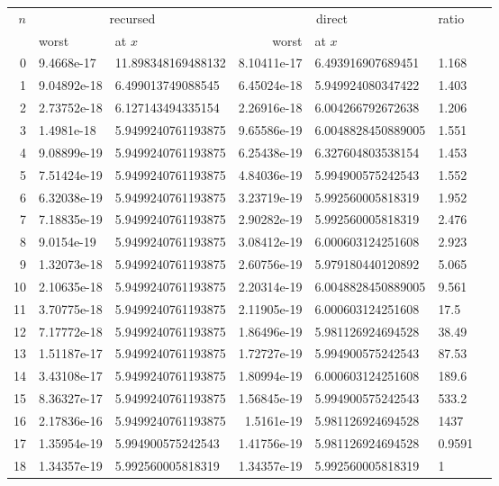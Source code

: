 \begin{tabular}{rllrllr}
\toprule
$n$ & \multicolumn{2}{c}{recursed} & \multicolumn{2}{c}{direct} & ratio\\
\cmidrule(lr){2-3}\cmidrule(lr){4-5}
 & worst & at $x$ & worst & at $x$ &\\
\midrule
 0 & 9.4668e-17 & 11.898348169488132 & 8.10411e-17 & 6.493916907689451 & 1.168\\
 1 & 9.04892e-18 & 6.499013749088545 & 6.45024e-18 & 5.949924080347422 & 1.403\\
 2 & 2.73752e-18 & 6.127143494335154 & 2.26916e-18 & 6.004266792672638 & 1.206\\
 3 & 1.4981e-18 & 5.9499240761193875 & 9.65586e-19 & 6.0048828450889005 & 1.551\\
 4 & 9.08899e-19 & 5.9499240761193875 & 6.25438e-19 & 6.327604803538154 & 1.453\\
 5 & 7.51424e-19 & 5.9499240761193875 & 4.84036e-19 & 5.994900575242543 & 1.552\\
 6 & 6.32038e-19 & 5.9499240761193875 & 3.23719e-19 & 5.992560005818319 & 1.952\\
 7 & 7.18835e-19 & 5.9499240761193875 & 2.90282e-19 & 5.992560005818319 & 2.476\\
 8 & 9.0154e-19 & 5.9499240761193875 & 3.08412e-19 & 6.000603124251608 & 2.923\\
 9 & 1.32073e-18 & 5.9499240761193875 & 2.60756e-19 & 5.979180440120892 & 5.065\\
10 & 2.10635e-18 & 5.9499240761193875 & 2.20314e-19 & 6.0048828450889005 & 9.561\\
11 & 3.70775e-18 & 5.9499240761193875 & 2.11905e-19 & 6.000603124251608 & 17.5\\
12 & 7.17772e-18 & 5.9499240761193875 & 1.86496e-19 & 5.981126924694528 & 38.49\\
13 & 1.51187e-17 & 5.9499240761193875 & 1.72727e-19 & 5.994900575242543 & 87.53\\
14 & 3.43108e-17 & 5.9499240761193875 & 1.80994e-19 & 6.000603124251608 & 189.6\\
15 & 8.36327e-17 & 5.9499240761193875 & 1.56845e-19 & 5.994900575242543 & 533.2\\
16 & 2.17836e-16 & 5.9499240761193875 & 1.5161e-19 & 5.981126924694528 & 1437\\
17 & 1.35954e-19 & 5.994900575242543 & 1.41756e-19 & 5.981126924694528 & 0.9591\\
18 & 1.34357e-19 & 5.992560005818319 & 1.34357e-19 & 5.992560005818319 & 1\\

\end{tabular}

